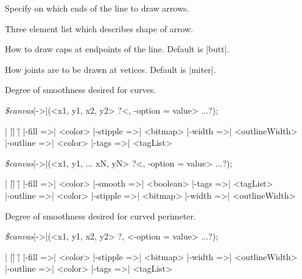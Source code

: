 \begin{enum}{1cm}

Specify on which ends of the line to draw arrows.

Three element list which describes shape of arrow.

How to draw caps at endpoints of the line. Default is |butt|.

How joints are to be  drawn at vetices. Default is |miter|.

Degree of smoothness desired for  curves.

\end{enum}
\vskip5pt

{\samepage
{\it \$canvas}|->|(<x1, y1, x2, y2> ?<, -option =\> value> ...?);
\begin{tabbing}
|                |\=|                   |\= \kill
|-fill =>| <color>        \> |-stipple =>| <bitmap> \> |-width =>| <outlineWidth> \\
|-outline =>| <color>     \> |-tags =>| <tagList>   \>  \\
\end{tabbing}
}

{\samepage
{\it \$canvas}|->|(<x1, y1, ... xN, yN> ?<, -option =\> value> ...?);
\begin{tabbing}
|                |\=|                   |\= \kill
|-fill =>| <color>    \> |-smooth =>| <boolean> \> |-tags =>| <tagList> \\
|-outline =>| <color> \> |-stipple =>| <bitmap> \> |-width =>| <outlineWidth> \\
\end{tabbing}
}
\vspace{-10pt}

\begin{enum}{1cm}

Degree of smoothness desired for curved perimeter.

\end{enum}
\vskip5pt

{\samepage
{\it \$canvas}|->|(<x1, y1, x2, y2> ?, <-option =\> value> ...?);
\begin{tabbing}
|                |\=|                   |\= \kill
|-fill =>| <color>        \> |-stipple =>| <bitmap> \> |-width =>| <outlineWidth> \\
|-outline =>| <color>     \> |-tags =>| <tagList>   \>  \\
\end{tabbing}
}

